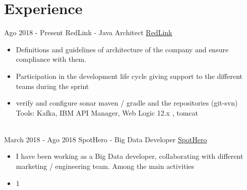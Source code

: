 \documentclass[letterpaper]{twentysecondcv} %
\begin{document}
\makeprofile %
 

\section{Experience}

\begin{twenty} %
\twentyitem
    	{Ago 2018 -}
		{Present}
        {RedLink - Java Architect}
        {\href{http://https://redlink.com.ar/}{RedLink}}
        {}
        {\begin{itemize}
        \item Definitions and guidelines of architecture of the company and ensure compliance with them.
        \item Participation in the development life cycle giving support to the different teams during the sprint
        \item verify and configure sonar maven / gradle and the repositories (git-svn)
        \newline
        \newline
        Tools: Kafka, IBM API Manager, Web Logic 12.x , tomcat 
        \end{itemize}}
        \\
        \twentyitem
   		{March 2018 -}
		{Ago 2018}
        {SpotHero - Big Data Developer}
        {\href{http://www.spothero.com}{SpotHero}}
        {}
        {
        {\begin{itemize}
        \item I have been working as a Big Data developer, collaborating with different marketing / engineering team.
        \newline
        \newline
        Among the main activities 
        \item 1
    \end{itemize}}
        }
     \\
        
\end{twenty}
\end{document}
